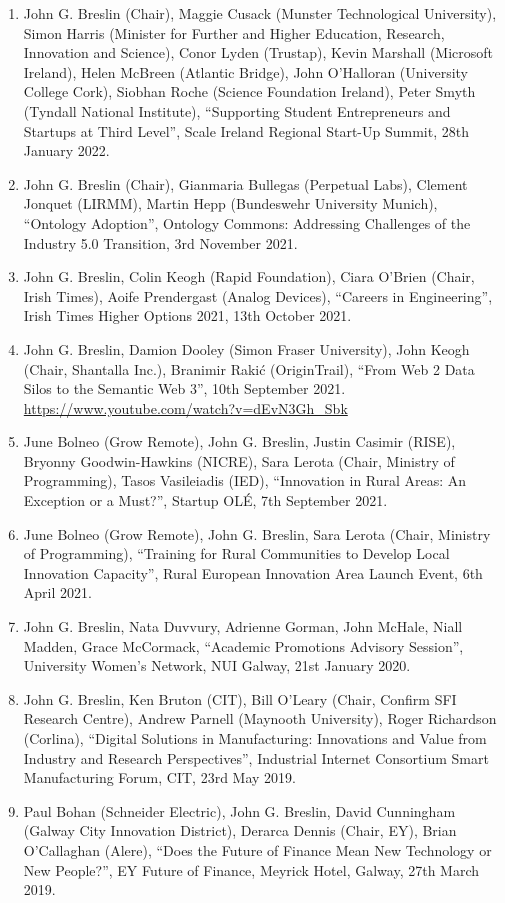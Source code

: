 \documentclass[10pt,a4paper]{res} %
\begin{document}
\begin{resume}
\begin{enumerate}
\item John G. Breslin (Chair), Maggie Cusack (Munster Technological University), Simon Harris (Minister for Further and Higher Education, Research, Innovation and Science), Conor Lyden (Trustap), Kevin Marshall (Microsoft Ireland), Helen McBreen (Atlantic Bridge), John O'Halloran (University College Cork), Siobhan Roche (Science Foundation Ireland), Peter Smyth (Tyndall National Institute), ``Supporting Student Entrepreneurs and Startups at Third Level'', Scale Ireland Regional Start-Up Summit, 28th January 2022.
\item John G. Breslin (Chair), Gianmaria Bullegas (Perpetual Labs), Clement Jonquet (LIRMM), Martin Hepp (Bundeswehr University Munich), ``Ontology Adoption'', Ontology Commons: Addressing Challenges of the Industry 5.0 Transition, 3rd November 2021.
\item John G. Breslin, Colin Keogh (Rapid Foundation), Ciara O'Brien (Chair, Irish Times), Aoife Prendergast (Analog Devices), ``Careers in Engineering'', Irish Times Higher Options 2021, 13th October 2021.
\item John G. Breslin, Damion Dooley (Simon Fraser University), John Keogh (Chair, Shantalla Inc.), Branimir Raki\'{c} (OriginTrail), ``From Web 2 Data Silos to the Semantic Web 3'', 10th September 2021. \url{https://www.youtube.com/watch?v=dEvN3Gh_Sbk}
\item June Bolneo (Grow Remote), John G. Breslin, Justin Casimir (RISE), Bryonny Goodwin-Hawkins (NICRE), Sara Lerota (Chair, Ministry of Programming), Tasos Vasileiadis (IED), ``Innovation in Rural Areas: An Exception or a Must?'', Startup OL\'{E}, 7th September 2021.
\item June Bolneo (Grow Remote), John G. Breslin, Sara Lerota (Chair, Ministry of Programming), ``Training for Rural Communities to Develop Local Innovation Capacity'', Rural European Innovation Area Launch Event, 6th April 2021.
\item John G. Breslin, Nata Duvvury, Adrienne Gorman, John McHale, Niall Madden, Grace McCormack, ``Academic Promotions Advisory Session'', University Women's Network, NUI Galway, 21st January 2020.
\item John G. Breslin, Ken Bruton (CIT), Bill O'Leary (Chair, Confirm SFI Research Centre), Andrew Parnell (Maynooth University), Roger Richardson (Corlina), ``Digital Solutions in Manufacturing: Innovations and Value from Industry and Research Perspectives'', Industrial Internet Consortium Smart Manufacturing Forum, CIT, 23rd May 2019.
\item Paul Bohan (Schneider Electric), John G. Breslin, David Cunningham (Galway City Innovation District), Derarca Dennis (Chair, EY), Brian O'Callaghan (Alere), ``Does the Future of Finance Mean New Technology or New People?'', EY Future of Finance, Meyrick Hotel, Galway, 27th March 2019.

\end{enumerate}
\end{resume}
\end{document}

